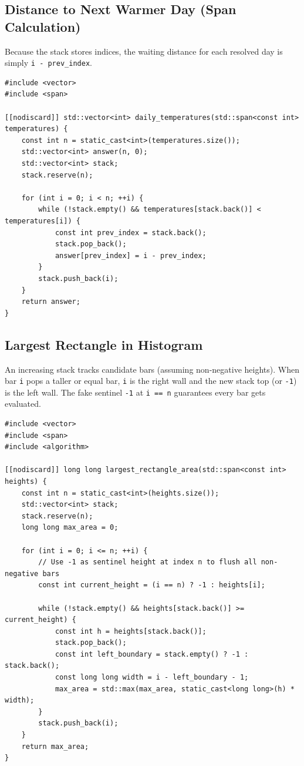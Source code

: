 \documentclass[11pt,a4paper]{article}
\theoremstyle{definition}
\begin{document}
\subsection{Distance to Next Warmer Day (Span Calculation)}

Because the stack stores indices, the waiting distance for each resolved day is simply \texttt{i - prev\_index}.

\begin{lstlisting}[caption=Span Calculation / Daily Temperatures in C++23]
#include <vector>
#include <span>

[[nodiscard]] std::vector<int> daily_temperatures(std::span<const int> temperatures) {
    const int n = static_cast<int>(temperatures.size());
    std::vector<int> answer(n, 0);
    std::vector<int> stack;
    stack.reserve(n);

    for (int i = 0; i < n; ++i) {
        while (!stack.empty() && temperatures[stack.back()] < temperatures[i]) {
            const int prev_index = stack.back();
            stack.pop_back();
            answer[prev_index] = i - prev_index;
        }
        stack.push_back(i);
    }
    return answer;
}
\end{lstlisting}

\subsection{Largest Rectangle in Histogram}

An increasing stack tracks candidate bars (assuming non-negative heights). When bar \texttt{i} pops a taller or equal bar, \texttt{i} is the right wall and the new stack top (or \texttt{-1}) is the left wall. The fake sentinel \texttt{-1} at \texttt{i == n} guarantees every bar gets evaluated.

\begin{lstlisting}[caption=Largest Rectangle in Histogram in C++23]
#include <vector>
#include <span>
#include <algorithm>

[[nodiscard]] long long largest_rectangle_area(std::span<const int> heights) {
    const int n = static_cast<int>(heights.size());
    std::vector<int> stack;
    stack.reserve(n);
    long long max_area = 0;

    for (int i = 0; i <= n; ++i) {
        // Use -1 as sentinel height at index n to flush all non-negative bars
        const int current_height = (i == n) ? -1 : heights[i];

        while (!stack.empty() && heights[stack.back()] >= current_height) {
            const int h = heights[stack.back()];
            stack.pop_back();
            const int left_boundary = stack.empty() ? -1 : stack.back();
            const long long width = i - left_boundary - 1;
            max_area = std::max(max_area, static_cast<long long>(h) * width);
        }
        stack.push_back(i);
    }
    return max_area;
}
\end{lstlisting}
\end{document}
